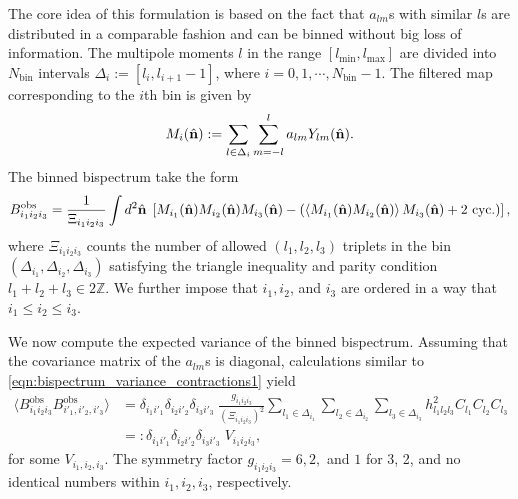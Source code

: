 The core idea of this formulation is based on the fact that $a_{lm}$s with similar $l$s are distributed in a comparable fashion and can be binned without big loss of information. The multipole moments $l$ in the range $[l_\text{min},l_\text{max}]$ are divided into $N_\text{bin}$ intervals $\Delta_i := [l_i,l_{i+1}-1]$, where $i=0,1,\cdots,N_\text{bin}-1$.  The filtered map corresponding to the $i$th bin is given by
\begin{align}
		M_i(\hat{\mathbf{n}}) := \sum_{l\in\Delta_i}\sum_{m=-l}^{l} a_{lm} Y_{lm}(\hat{\mathbf{n}}).
\end{align}
The binned bispectrum take the form
\begin{align}
	B^\text{obs}_{i_1 i_2 i_3} = \frac{1}{\Xi_{i_1 i_2 i_3}} \int d^2 \hat{\mathbf{n}} \; \left[ M_{i_1} (\hat{\mathbf{n}}) M_{i_2} (\hat{\mathbf{n}}) M_{i_3} (\hat{\mathbf{n}}) - \left( \left< M_{i_1} (\hat{\mathbf{n}}) M_{i_2} (\hat{\mathbf{n}}) \right> M_{i_3} (\hat{\mathbf{n}}) + \text{2 cyc.}\right)  \right],
\end{align}
where $\Xi_{i_1 i_2 i_3}$ counts the number of allowed $(l_1,l_2,l_3)$ triplets in the bin $(\Delta_{i_1},\Delta_{i_2},\Delta_{i_3})$ satisfying the triangle inequality and parity condition $l_1+l_2+l_3 \in 2\mathbb{Z}$. We further impose that $i_1,i_2$, and $i_3$ are ordered in a way that $i_1 \le i_2 \le i_3$.

We now compute the expected variance of the binned bispectrum. Assuming that the covariance matrix of the $a_{lm}$s is diagonal, calculations similar to \eqref{eqn:bispectrum_variance_contractions1} yield
\begin{align}
	\langle B^\text{obs}_{i_1 i_2 i_3} B^\text{obs}_{i'_1,i'_2,i'_3} \rangle &=  \delta_{i_1 i'_1} \delta_{i_2 i'_2} \delta_{i_3 i'_3} \; \frac{g_{i_1 i_2 i_3}}{(\Xi_{i_1 i_2 i_3})^2} \sum_{l_1 \in \Delta_{i_1}} \sum_{l_2 \in \Delta_{i_2}} \sum_{l_3 \in \Delta_{i_3}} h^2_{l_1 l_2 l_3} C_{l_1} C_{l_2} C_{l_3} \\
	&=: \delta_{i_1 i'_1} \delta_{i_2 i'_2} \delta_{i_3 i'_3} \; V_{i_1 i_2 i_3},
\end{align}
for some $V_{i_1,i_2,i_3}$. The symmetry factor $g_{i_1 i_2 i_3}=6,2,$ and $1$ for 3, 2, and no identical numbers within $i_1,i_2,i_3$, respectively.

